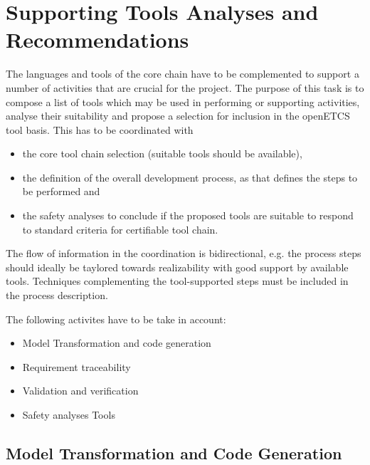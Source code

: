 \documentclass{template/openetcs_article}
\begin{document}
\section{Supporting Tools Analyses and Recommendations}
\label{sec:supporting_tools}

The languages and tools  of the core chain have to be complemented to support a number of activities that are crucial for the project. The purpose of this task is to compose a list of tools which may be
used in performing or supporting  activities, analyse their
suitability and propose a selection for inclusion in the openETCS tool
basis. This has to be coordinated with 

\begin{itemize}
\item the core tool chain selection (suitable  tools should be
  available), 
\item the definition of the overall development process, as that defines the steps to be performed and 
\item the safety analyses to  conclude if the proposed tools are suitable to  respond to standard criteria for certifiable tool chain.
\end{itemize}

The flow of information in the coordination is bidirectional, e.g. the process
steps should ideally be taylored towards realizability with good
support by available tools. Techniques complementing the
tool-supported steps must be included in the process description. 
  
The following activites have to be take in account:

\begin{itemize}
\item Model Transformation and code generation 
\item Requirement traceability
\item Validation and verification
\item Safety analyses Tools
\end{itemize}


\subsection{Model Transformation and Code Generation}
\end{document}
